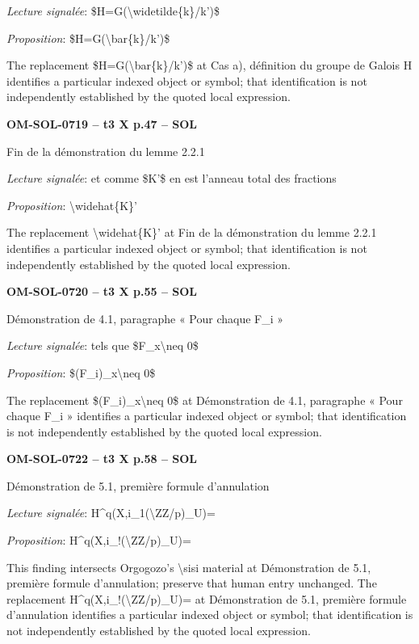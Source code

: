 \emph{Lecture signalée}: \$H=\allowbreak G(\textbackslash{}widetilde\{k\}/k')\$\par
\emph{Proposition}: \$H=\allowbreak G(\textbackslash{}bar\{k\}/k')\$\par
The replacement \$H=\allowbreak G(\textbackslash{}bar\{k\}/k')\$ at Cas a), définition du groupe de Galois H identifies a particular indexed object or symbol; that identification is not independently established by the quoted local expression.\par
\par\noindent\textbf{OM-SOL-0719 -- t3 X p.47 -- SOL}\par
Fin de la démonstration du lemme 2.2.1\par
\emph{Lecture signalée}: et comme \$K'\$ en est l'anneau total des fractions\par
\emph{Proposition}: \textbackslash{}widehat\{K\}'\par
The replacement \textbackslash{}widehat\{K\}' at Fin de la démonstration du lemme 2.2.1 identifies a particular indexed object or symbol; that identification is not independently established by the quoted local expression.\par
\par\noindent\textbf{OM-SOL-0720 -- t3 X p.55 -- SOL}\par
Démonstration de 4.1, paragraphe « Pour chaque F\_i »\par
\emph{Lecture signalée}: tels que \$F\_x\textbackslash{}neq 0\$\par
\emph{Proposition}: \$(F\_i)\_x\textbackslash{}neq 0\$\par
The replacement \$(F\_i)\_x\textbackslash{}neq 0\$ at Démonstration de 4.1, paragraphe « Pour chaque F\_i » identifies a particular indexed object or symbol; that identification is not independently established by the quoted local expression.\par
\par\noindent\textbf{OM-SOL-0722 -- t3 X p.58 -- SOL}\par
Démonstration de 5.1, première formule d'annulation\par
\emph{Lecture signalée}: H\textasciicircum{}q(X,i\_1(\textbackslash{}ZZ/p)\_U)=\par
\emph{Proposition}: H\textasciicircum{}q(X,i\_!(\textbackslash{}ZZ/p)\_U)=\par
This finding intersects Orgogozo's \textbackslash{}sisi material at Démonstration de 5.1, première formule d'annulation; preserve that human entry unchanged. The replacement H\textasciicircum{}q(X,i\_!(\textbackslash{}ZZ/p)\_U)= at Démonstration de 5.1, première formule d'annulation identifies a particular indexed object or symbol; that identification is not independently established by the quoted local expression.\par
